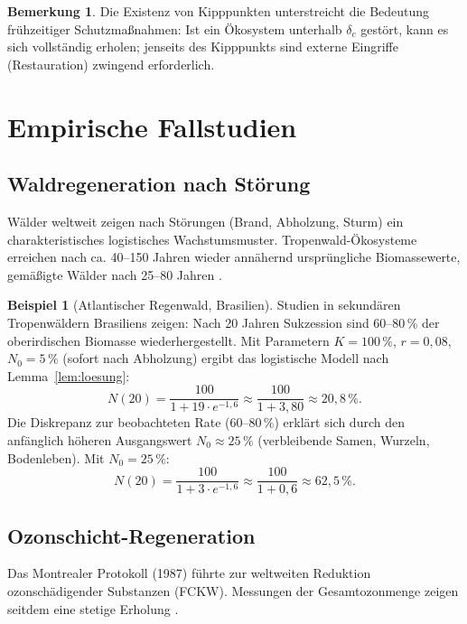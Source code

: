 ﻿\documentclass[a4paper,12pt]{article}
\theoremstyle{definition}
\newtheorem{beispiel}{Beispiel}
\newtheorem{bemerkung}{Bemerkung}
\begin{document}
\begin{bemerkung}
	Die Existenz von Kipppunkten unterstreicht die Bedeutung frühzeitiger Schutzmaßnahmen: Ist ein Ökosystem unterhalb $\delta_c$ gestört, kann es sich vollständig erholen; jenseits des Kipppunkts sind externe Eingriffe (Restauration) zwingend erforderlich.
\end{bemerkung}

\section{Empirische Fallstudien}
\label{sec:fallstudien}

\subsection{Waldregeneration nach Störung}

Wälder weltweit zeigen nach Störungen (Brand, Abholzung, Sturm) ein charakteristisches logistisches Wachstumsmuster. Tropenwald-Ökosysteme erreichen nach ca. 40--150 Jahren wieder annähernd ursprüngliche Biomassewerte, gemäßigte Wälder nach 25--80 Jahren \cite{chazdon2016forest}.

\begin{beispiel}[Atlantischer Regenwald, Brasilien]
	Studien in sekundären Tropenwäldern Brasiliens zeigen: Nach 20 Jahren Sukzession sind 60--80\,\% der oberirdischen Biomasse wiederhergestellt. Mit Parametern $K = 100\,\%$, $r = 0{,}08$, $N_0 = 5\,\%$ (sofort nach Abholzung) ergibt das logistische Modell nach Lemma~\ref{lem:loesung}:
	\[
	N(20) = \frac{100}{1 + 19 \cdot e^{-1{,}6}} \approx \frac{100}{1 + 3{,}80} \approx 20{,}8\,\%.
	\]
	Die Diskrepanz zur beobachteten Rate (60--80\,\%) erklärt sich durch den anfänglich höheren Ausgangswert $N_0 \approx 25\,\%$ (verbleibende Samen, Wurzeln, Bodenleben). Mit $N_0 = 25\,\%$:
	\[
	N(20) = \frac{100}{1 + 3 \cdot e^{-1{,}6}} \approx \frac{100}{1 + 0{,}6} \approx 62{,}5\,\%.
	\]
\end{beispiel}

\subsection{Ozonschicht-Regeneration}

Das Montrealer Protokoll (1987) führte zur weltweiten Reduktion ozonschädigender Substanzen (FCKW). Messungen der Gesamtozonmenge zeigen seitdem eine stetige Erholung \cite{solomon2016emergence}.
\end{document}
